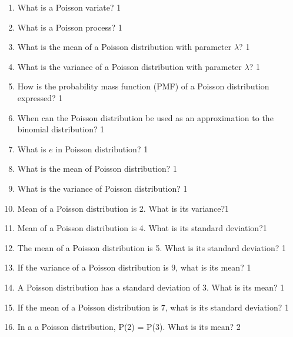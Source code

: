 \documentclass[a4paper,oneside, margin=1.4in]{book}
\begin{document}
\begin{enumerate}

  \item What is a Poisson variate? \hfill 1
  
  \item What is a Poisson process?  \hfill 1
  
  \item What is the mean of a Poisson distribution with parameter \( \lambda \)? \hfill 1

\item What is the variance of a Poisson distribution with parameter \( \lambda \)? \hfill 1

\item How is the probability mass function (PMF) of a Poisson distribution expressed? \hfill 1

\item When can the Poisson distribution be used as an approximation to the binomial distribution? \hfill 1

\item What is $e$ in Poisson distribution? \hfill 1

\item What is the mean of Poisson distribution? \hfill 1

\item What is the variance of Poisson distribution? \hfill 1

\item Mean of a Poisson distribution is 2. What is its variance?\hfill 1

\item Mean of a Poisson distribution is 4. What is its standard deviation?\hfill 1

\item The mean of a Poisson distribution is 5. What is its standard deviation? \hfill 1

\item If the variance of a Poisson distribution is 9, what is its mean? \hfill 1

\item A Poisson distribution has a standard deviation of 3. What is its mean? \hfill 1

\item If the mean of a Poisson distribution is 7, what is its standard deviation? \hfill 1

\item In a a Poisson distribution, P(2) = P(3). What is its mean?  \hfill 2


\end{enumerate}
\end{document}
